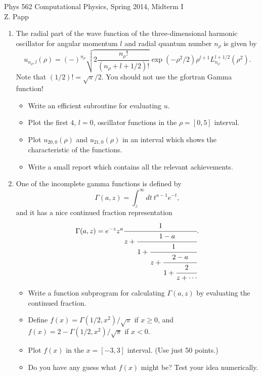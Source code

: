 \documentclass[showpacs,pra,aps,amsmath,amssymb,unsortedaddress]{revtex4-1}
\begin{document}
\begin{center}
\Large Phys 562 Computational Physics, Spring 2014,  Midterm I \\
\large Z. Papp
\end{center}

\large

\begin{enumerate}

\item The radial part of the wave function of the three-dimensional harmonic oscillator 
for angular momentum $l$ and radial quantum number $n_{\rho}$ is given by
$$
u_{n_{\rho},l}(\rho)=(-)^{n_{\rho}} \sqrt{2 \frac{ n_{\rho}! }{ (n_{\rho}+l+1/2)!}} \exp(-\rho^{2}/2) \rho^{l+1} L_{n_{\rho}}^{l+1/2}(\rho^{2}).
$$
Note that $(1/2)!=\sqrt{\pi}/2$. You should not use the gfortran Gamma function!

\begin{itemize}

\item Write an efficient  subroutine for evaluating $u$. 

\item Plot the first $4$, $l=0$, oscillator functions in the $\rho=[0,5]$ interval.

\item Plot $u_{20,0}(\rho)$ and $u_{21,0}(\rho)$ in an interval which shows the characteristic of the functions. 

\item Write a small report which contains all the relevant achievements.

\end{itemize}


\item One of the incomplete gamma functions is defined by 
$$
\Gamma(a,z)=\int_{z}^{\infty} dt \: t^{a-1} e^{-t},
$$
and it has a nice continued fraction representation
$$
\Gamma(a,z)=e^{-z}z^{a} \cfrac{1}{z  
						+ \cfrac{1-a}{1
						+ \cfrac{1}{z
						+ \cfrac{2-a}{1
						+ \cfrac{2}{z + \cdots }}}}} .
$$

\begin{itemize}

\item Write a function subprogram for calculating $\Gamma(a,z)$ by evaluating the continued fraction. 

\item Define $f(x) = \Gamma(1/2,x^{2})/\sqrt{\pi}$ if $x \ge 0$, and $f(x) = 2-  \Gamma(1/2,x^{2})/\sqrt{\pi}$ if $x < 0$.

\item Plot $f(x)$ in the $x=[-3,3]$ interval. (Use just 50 points.)

\item Do you have any guess what $f(x)$ might be? Test your idea numerically.

\end{itemize}


\end{enumerate}
\end{document}
